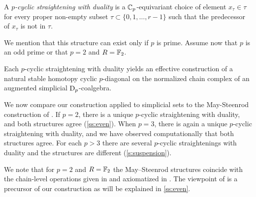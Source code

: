 \begin{definition}
	A \emph{$p$-cyclic straightening with duality} is a $\mathbb{C}_p$-equivariant choice of element $x_\tau\in \tau$ for every proper non-empty subset $\tau \subset \{0,1,\dots,r-1\}$ such that the predecessor of $x_\tau$ is not in $\tau$.
\end{definition}
We mention that this structure can exist only if $p$ is prime. Assume now that $p$ is an odd prime or that $p=2$ and $R=\mathbb{F}_2$.

\begin{theorem}\label{thm:main}
	Each $p$-cyclic straightening with duality yields an effective construction of a natural stable homotopy cyclic $p$-diagonal on the normalized chain complex of an augmented simplicial $\mathrm{D}_p$-coalgebra.
\end{theorem}


We now compare our construction applied to simplicial sets to the May-Steenrod construction of \cite{medina2021may_st}. If $p=2$, there is a unique $p$-cyclic straightening with duality, and both structures agree (\cref{ss:even}). When $p=3$, there is again a unique $p$-cyclic straightening with duality, and we have observed computationally that both structures agree. For each $p>3$ there are several $p$-cyclic straightenings with duality and the structures are different (\cref{s:suspension}). 

We note that for $p=2$ and $R=\mathbb{F}_2$ the May--Steenrod structures coincide with the chain-level operations given in \cite{medina2021fast_sq} and axiomatized in \cite{medina2022axiomatic}. The viewpoint of \cite{medina2021fast_sq} is a precursor of our construction as will be explained in \cref{ss:even}. 







